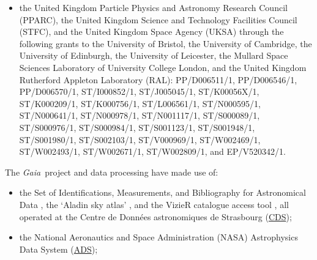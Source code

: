 \documentclass{aa}
\newcommand{\gaia}{\textit{Gaia}\xspace}
\begin{document}
\begin{appendix}
\begin{itemize}
\item the United Kingdom Particle Physics and Astronomy Research Council (PPARC), the United Kingdom Science and Technology Facilities Council (STFC), and the United Kingdom Space Agency (UKSA) through the following grants to the University of Bristol, the University of Cambridge, the University of Edinburgh, the University of Leicester, the Mullard Space Sciences Laboratory of University College London, and the United Kingdom Rutherford Appleton Laboratory (RAL): PP/D006511/1, PP/D006546/1, PP/D006570/1, ST/I000852/1, ST/J005045/1, ST/K00056X/1, ST/\-K000209/1, ST/K000756/1, ST/L006561/1, ST/N000595/1, ST/N000641/1, ST/N000978/1, ST/\-N001117/1, ST/S000089/1, ST/S000976/1, ST/S000984/1, ST/S001123/1, ST/S001948/1, ST/\-S001980/1, ST/S002103/1, ST/V000969/1, ST/W002469/1, ST/W002493/1, ST/W002671/1, ST/W002809/1, and EP/V520342/1.
\end{itemize}

The \gaia\ project and data processing have made use of:
\begin{itemize}
\item the Set of Identifications, Measurements, and Bibliography for Astronomical Data \citep[SIMBAD,][]{2000AAS..143....9W}, the `Aladin sky atlas' \citep{2000A&AS..143...33B,2014ASPC..485..277B}, and the VizieR catalogue access tool \citep{2000A&AS..143...23O}, all operated at the Centre de Donn\'{e}es astronomiques de Strasbourg (\href{http://cds.u-strasbg.fr/}{CDS});
\item the National Aeronautics and Space Administration (NASA) Astrophysics Data System (\href{http://adsabs.harvard.edu/abstract_service.html}{ADS});


\end{itemize}
\end{appendix}
\end{document}
